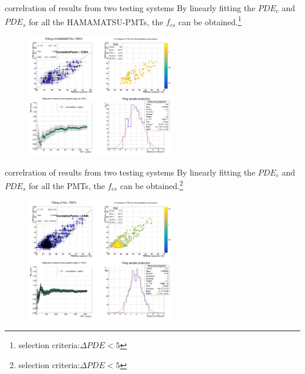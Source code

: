 \documentclass[11pt,compress,xcolor=x11names,UTF8]{beamer}
\begin{document}
\begin{frame}{correlration of results from two testing systems}
By linearly fitting the $PDE_c$ and $PDE_s$ for all the HAMAMATSU-PMTs, the $f_{cs}$ can be obtained.\footnote{selection criteria:$\Delta PDE<5$}
\begin{figure}
\centering
\includegraphics[width=0.58\textwidth]{fit_hmp_noint}
\end{figure}
\end{frame}
\begin{frame}{correlration of results from two testing systems}
By linearly fitting the $PDE_c$ and $PDE_s$ for all the PMTs, the $f_{cs}$ can be obtained.\footnote{selection criteria:$\Delta PDE<5$}
\begin{figure}
\centering
\includegraphics[width=0.58\textwidth]{fit_all_pmts}
\end{figure}
\end{frame}
\end{document}
